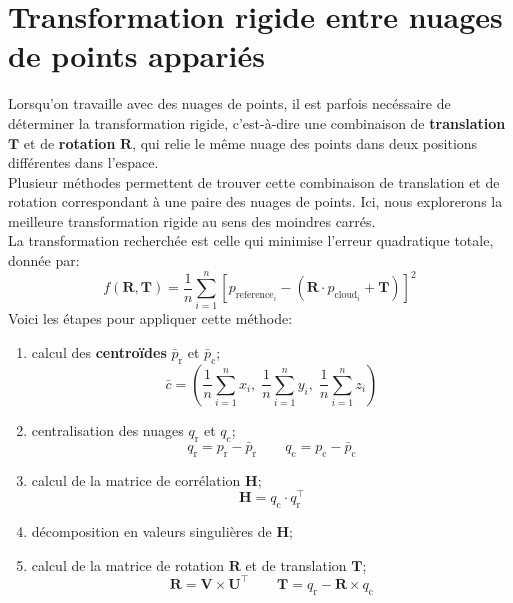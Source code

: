 \documentclass[../5RO17_TP4.tex]{subfiles}
\begin{document}
\section{Transformation rigide entre nuages de points appariés}
\noindent Lorsqu'on travaille avec des nuages de points, il est parfois necéssaire de déterminer la transformation rigide, c'est-à-dire une combinaison de \textbf{translation} $\mathbf{T}$ et de \textbf{rotation} $\mathbf{R}$, qui relie le même nuage des points dans deux positions différentes dans l'espace.\\

\noindent Plusieur méthodes permettent de trouver cette combinaison de translation et de rotation correspondant à une paire des nuages de points. Ici, nous explorerons la meilleure transformation rigide au sens des moindres carrés.\\

\noindent La transformation recherchée est celle qui minimise l'erreur quadratique totale, donnée par:
\begin{equation}
    f(\mathbf{R}, \mathbf{T}) = \frac{1}{n} \sum_{i=1}^{n} \left[ p_{\text{reference}_i} - (\mathbf{R} \cdot p_{\text{cloud}_i} + \mathbf{T}) \right]^{2}
\end{equation}
Voici les étapes pour appliquer cette méthode:
\begin{enumerate}[noitemsep]
    \item calcul des \textbf{centroïdes} $\bar{p}_{\text{r}}$ et $\bar{p}_{\text{c}}$;
    \begin{equation*}
        \bar{c} = \left(
            \frac{1}{n} \sum_{i=1}^{n} x_{i},\;
            \frac{1}{n} \sum_{i=1}^{n} y_{i},\;
            \frac{1}{n} \sum_{i=1}^{n} z_{i} 
        \right)
    \end{equation*}
    \item centralisation des nuages $q_{\text{r}}$ et $q_{\text{c}}$;
    \begin{equation*}
        q_{\text{r}} = p_{\text{r}} - \bar{p}_{\text{r}}
        \qquad
        q_{\text{c}} = p_{\text{c}} - \bar{p}_{\text{c}}
    \end{equation*}
    \item calcul de la matrice de corrélation $\mathbf{H}$;
    \begin{equation*}
        \mathbf{H} = q_{\text{c}} \cdot q_{\text{r}} ^ {\intercal}
    \end{equation*}
    \item décomposition en valeurs singulières de $\mathbf{H}$;
    \item calcul de la matrice de rotation $\mathbf{R}$ et de translation $\mathbf{T}$;
    \begin{equation*}
        \mathbf{R} = \mathbf{V} \times \mathbf{U}^{\intercal}
        \qquad
        \mathbf{T} = q_{\text{r}} - \mathbf{R} \times q_{\text{c}}
    \end{equation*}
\end{enumerate}
\end{document}
